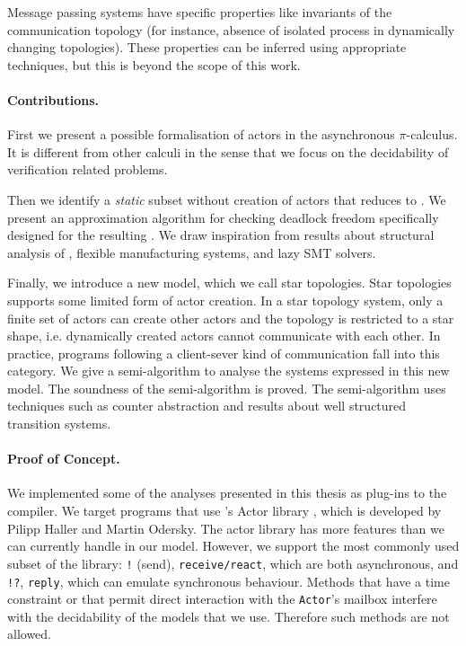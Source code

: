 \documentclass[a4paper]{report}
\numberwithin{algorithm}{chapter}
\begin{document}
Message passing systems have specific properties like invariants of the communication topology
(for instance, absence of isolated process in dynamically changing topologies).
These properties can be inferred using appropriate techniques, but this is beyond the scope of this work.

\paragraph{Contributions.}
First we present a possible formalisation of actors in the asynchronous $\pi$-calculus.
It is different from other calculi \cite{DBLP:conf/birthday/AghaT04} in the sense that we focus on the decidability of verification related problems.

Then we identify a \emph{static} subset without creation of actors that reduces to \pns{}.
We present an approximation algorithm for checking deadlock freedom specifically designed for the resulting \pns{}.
We draw inspiration from results about structural analysis of \pns{}, flexible manufacturing systems, and lazy SMT solvers.

Finally, we introduce a new model, which we call star topologies.
Star topologies supports some limited form of actor creation.
In a star topology system, only a finite set of actors can create other actors and the topology is restricted to a star shape, i.e. dynamically created actors cannot communicate with each other.
In practice, programs following a client-sever kind of communication fall into this category.
We give a semi-algorithm to analyse the systems expressed in this new model.
The soundness of the semi-algorithm is proved.
The semi-algorithm uses techniques such as counter abstraction and results about well structured transition systems.

\paragraph{Proof of Concept.}
We implemented some of the analyses presented in this thesis as plug-ins to the \scala{} compiler.
We target programs that use \scala{}'s Actor library \cite{DBLP:conf/jmlc/HallerO06,DBLP:conf/coordination/HallerO07}, which is developed by Pilipp Haller and Martin Odersky.
The actor library has more features than we can currently handle in our model.
However, we support the most commonly used subset of the library: \texttt{!} (send), \texttt{receive/react}, which are both asynchronous, and \texttt{!?}, \texttt{reply}, which can emulate synchronous behaviour.
Methods that have a time constraint or that permit direct interaction with the \texttt{Actor}'s mailbox interfere with the decidability of the models that we use.
Therefore such methods are not allowed.
\end{document}
